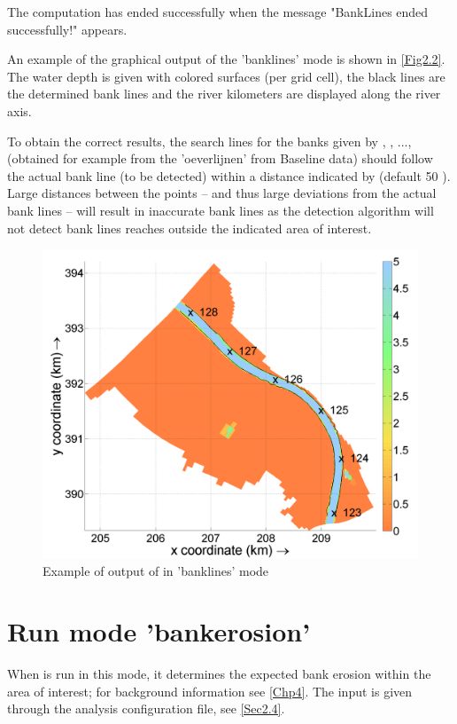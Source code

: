 The computation has ended successfully when the message "BankLines ended successfully!" appears.

An example of the graphical output of the 'banklines' mode is shown in \autoref{Fig2.2}.
The water depth is given with colored surfaces (per grid cell), the black lines are the determined bank lines and the river kilometers are displayed along the river axis.

\Note To obtain the correct results, the search lines for the banks given by , , ...,  (obtained for example from the 'oeverlijnen' from Baseline data) should follow the actual bank line (to be detected) within a distance indicated by  (default 50 ).
Large distances between the points -- and thus large deviations from the actual bank lines -- will result in inaccurate bank lines as the detection algorithm will not detect bank lines reaches outside the indicated area of interest.

\begin{figure}
\includegraphics[width=\textwidth]{figures/Fig2-2.png}
\caption{Example of output of \dfastbe in 'banklines' mode}
\label{Fig2.2}
\end{figure}

\section{Run mode 'bankerosion'}

When \dfastbe is run in this mode, it determines the expected bank erosion within the area of interest; for background information see \autoref{Chp4}.
The input is given through the analysis configuration file, see \autoref{Sec2.4}.

